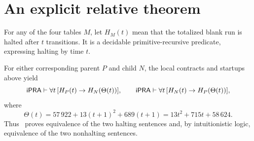 \section{An explicit relative theorem}
For any of the four tables $M$, let $H_M(t)$ mean that the totalized blank
run is halted after $t$ transitions. It is a decidable primitive-recursive
predicate, expressing halting by time $t$.
\begin{theorem}
For either corresponding parent $P$ and child $N$, the local contracts
and startups above yield
\[
 \mathsf{iPRA}\vdash\forall t\,[H_P(t)\to H_N(\Theta(t))],\qquad
 \mathsf{iPRA}\vdash\forall t\,[H_N(t)\to H_P(\Theta(t))],
\]
where
\[
 \boxed{\Theta(t)=57\,922+13(t+1)^2+689(t+1)
                   =13t^2+715t+58\,624.}
\]
Thus \ipra\ proves equivalence of the two halting sentences and, by
intuitionistic logic, equivalence of the two nonhalting sentences.
\end{theorem}
